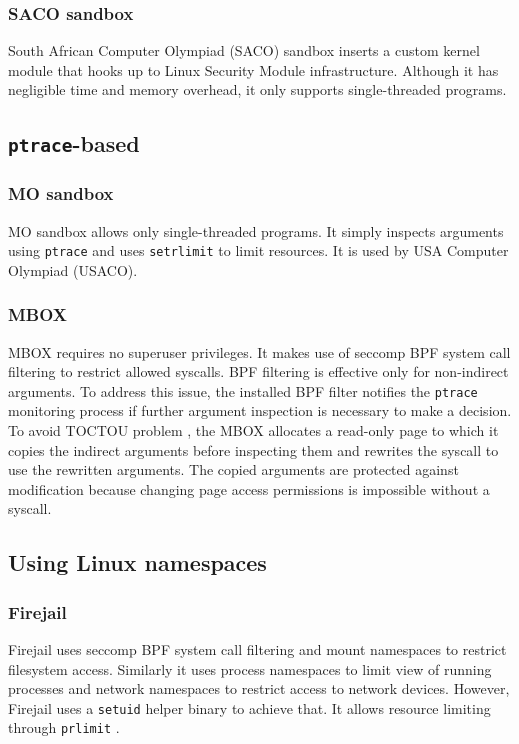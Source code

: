 \documentclass[en]{pracamgr}
\begin{document}
\subsubsection{SACO sandbox}

South African Computer Olympiad (SACO) sandbox \cite{merry2009using} inserts a custom kernel module that hooks up to Linux Security Module infrastructure. Although it has negligible time and memory overhead, it only supports single-threaded programs.

\subsection{\texttt{ptrace}-based}

\subsubsection{MO sandbox}
MO sandbox \cite{marevs2007perspectives, kolstad2009infrastructure} allows only single-threaded programs. It simply inspects arguments using \texttt{ptrace} and uses \texttt{setrlimit} \cite{man_getrlimit_setrlimit_prlimit} to limit resources. It is used by USA Computer Olympiad (USACO).

\subsubsection{MBOX}
MBOX \cite{kim2013practical} requires no superuser privileges. It makes use of seccomp BPF system call filtering to restrict allowed syscalls. BPF filtering is effective only for non-indirect arguments. To address this issue, the installed BPF filter notifies the \texttt{ptrace} monitoring process if further argument inspection is necessary to make a decision. To avoid TOCTOU problem \cite{cwe_toctou}, the MBOX allocates a read-only page to which it copies the indirect arguments before inspecting them and rewrites the syscall to use the rewritten arguments. The copied arguments are protected against modification because changing page access permissions is impossible without a syscall.

\subsection{Using Linux namespaces}

\subsubsection{Firejail}
Firejail \cite{netblue30/firejail} uses seccomp BPF system call filtering and mount namespaces to restrict filesystem access. Similarly it uses process namespaces to limit view of running processes and network namespaces to restrict access to network devices. However, Firejail uses a \texttt{setuid} \cite{man_setuid} helper binary to achieve that. It allows resource limiting through \texttt{prlimit} \cite{man_getrlimit_setrlimit_prlimit}.
\end{document}
